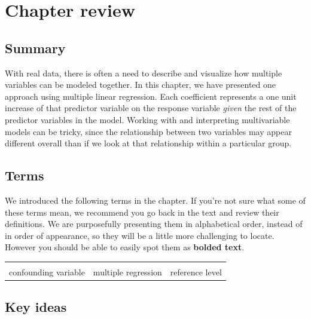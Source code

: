 \documentclass[
  10pt,
  openany]{book}
\theoremstyle{definition}
\theoremstyle{definition}
\theoremstyle{definition}
\theoremstyle{definition}
\theoremstyle{remark}
\begin{document}
\section{Chapter review}\label{chp7-review}

\subsection*{Summary}\label{summary-5}

With real data, there is often a need to describe and visualize how multiple variables can be modeled together.
In this chapter, we have presented one approach using multiple linear regression.
Each coefficient represents a one unit increase of that predictor variable on the response variable \emph{given} the rest of the predictor variables in the model.
Working with and interpreting multivariable models can be tricky, since the relationship between two variables may appear different overall than if we look at that relationship within a particular group.

\subsection*{Terms}\label{terms-6}

We introduced the following terms in the chapter.
If you're not sure what some of these terms mean, we recommend you go back in the text and review their definitions.
We are purposefully presenting them in alphabetical order, instead of in order of appearance, so they will be a little more challenging to locate.
However you should be able to easily spot them as \textbf{bolded text}.

\begin{tabu} to 
\toprule
{} &  & \\
confounding variable & multiple regression & reference level\\
\bottomrule
\end{tabu}

\subsection*{Key ideas}\label{key-ideas-5}
\end{document}
